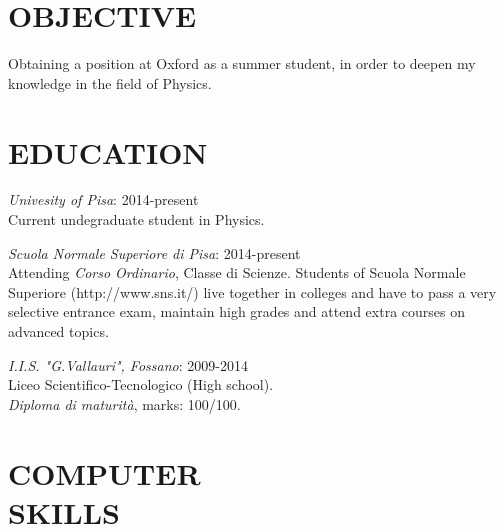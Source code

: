 \documentclass[margin, 10pt]{res} %
\begin{document}
\begin{resume}

 
\section{OBJECTIVE}  

Obtaining a position at Oxford as a summer student, in order to deepen my knowledge in the field of Physics.



\section{EDUCATION}

{\sl Univesity of Pisa}:   \hfill 2014-present \\
Current undegraduate student in Physics.

{\sl Scuola Normale Superiore di Pisa}: \hfill 2014-present \\
Attending \textit{Corso Ordinario}, Classe di Scienze.
Students of Scuola Normale Superiore (http://www.sns.it/) live together in colleges and have to pass a very selective entrance exam, maintain high grades and attend extra courses on advanced topics.

{\sl I.I.S. "G.Vallauri", Fossano}:  \hfill 2009-2014 \\
Liceo Scientifico-Tecnologico (High school).\\ 
\textit{Diploma di maturit\`a}, marks: 100/100.


 

\section{COMPUTER \\ SKILLS} 


\end{resume}
\end{document}
